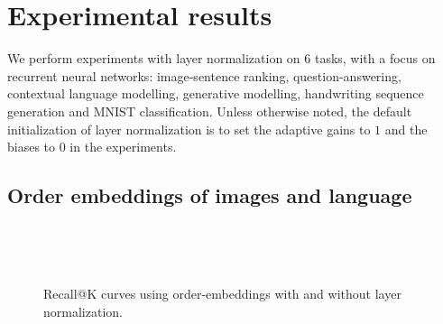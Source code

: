 \documentclass{article}
\begin{document}
\section{Experimental results}
\label{sec:exp}

We perform experiments with layer normalization on 6 tasks, with a focus on recurrent neural networks: image-sentence ranking, question-answering, contextual language modelling, generative modelling, handwriting sequence generation and MNIST classification. Unless otherwise noted, the default initialization of layer normalization is to set the adaptive gains to $1$ and the biases to $0$ in the experiments. 


\subsection{Order embeddings of images and language}

\begin{figure}
  \vspace{-0.3in}
  \centering
  \mbox{
    \quad
  }
 
  \caption{Recall@K curves using order-embeddings with and without layer normalization.
  \vspace{-0.05in}
  }
\label{fig:orderemb}
    ~\\[-.1in]
\end{figure}
\end{document}
